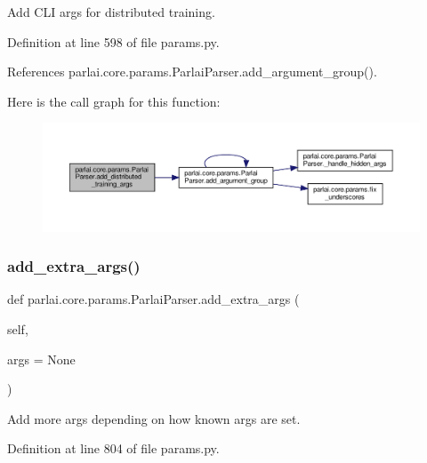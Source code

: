 \begin{DoxyVerb}Add CLI args for distributed training.\end{DoxyVerb}
 

Definition at line 598 of file params.\+py.



References parlai.\+core.\+params.\+Parlai\+Parser.\+add\+\_\+argument\+\_\+group().

Here is the call graph for this function\+:
\nopagebreak
\begin{figure}[H]
\begin{center}
\leavevmode
\includegraphics[width=350pt]{classparlai_1_1core_1_1params_1_1ParlaiParser_a718f9802eec8bcac25866900d2ae69b0_cgraph}
\end{center}
\end{figure}
\mbox{\label{classparlai_1_1core_1_1params_1_1ParlaiParser_ade9c068595c2b1110d019f3dedeb79ba}} 
\subsubsection{\texorpdfstring{add\+\_\+extra\+\_\+args()}{add\_extra\_args()}}
{\footnotesize\ttfamily def parlai.\+core.\+params.\+Parlai\+Parser.\+add\+\_\+extra\+\_\+args (\begin{DoxyParamCaption}\item[{}]{self,  }\item[{}]{args = {\ttfamily None} }\end{DoxyParamCaption})}

\begin{DoxyVerb}Add more args depending on how known args are set.\end{DoxyVerb}
 

Definition at line 804 of file params.\+py.



